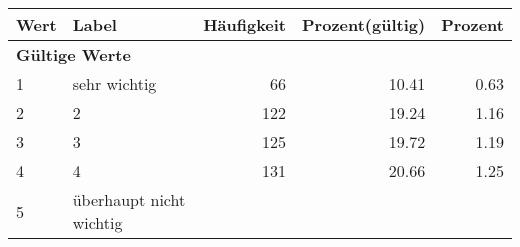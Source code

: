      \begin{longtable}{lXrrr}
     \toprule
     \textbf{Wert} & \textbf{Label} & \textbf{Häufigkeit} & \textbf{Prozent(gültig)} & \textbf{Prozent} \\
     \endhead
     \midrule
     \multicolumn{5}{l}{\textbf{Gültige Werte}}\\

     1 &
     \multicolumn{1}{X}{ sehr wichtig   } &


       \num{66} &
       \num[round-mode=places,round-precision=2]{10,41} &
         \num[round-mode=places,round-precision=2]{0,63} \\

     2 &
     \multicolumn{1}{X}{ 2   } &


       \num{122} &
       \num[round-mode=places,round-precision=2]{19,24} &
         \num[round-mode=places,round-precision=2]{1,16} \\

     3 &
     \multicolumn{1}{X}{ 3   } &


       \num{125} &
       \num[round-mode=places,round-precision=2]{19,72} &
         \num[round-mode=places,round-precision=2]{1,19} \\

     4 &
     \multicolumn{1}{X}{ 4   } &


       \num{131} &
       \num[round-mode=places,round-precision=2]{20,66} &
         \num[round-mode=places,round-precision=2]{1,25} \\

     5 &
     \multicolumn{1}{X}{ überhaupt nicht wichtig   } &



\end{longtable}
